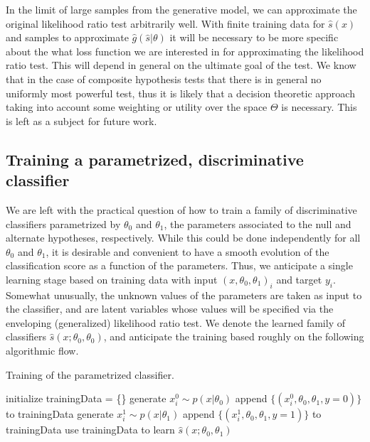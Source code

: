 \documentclass[11pt, oneside]{article}   	%
\begin{document}

In the  limit of large samples from the generative model,  we can approximate the original likelihood ratio test arbitrarily well. With finite training data for $\hat{s}(x)$ and samples to approximate $\hat{g}(\hat{s}|\theta)$ it will be necessary to be more specific about the what loss function we are interested in for approximating the likelihood ratio test. This will depend in general on the ultimate goal of the test. We know that in the case of composite hypothesis tests that there is in general no uniformly most powerful test, thus it is likely that a decision theoretic approach taking into account some weighting or utility over the space $\Theta$ is necessary. This is left as a subject for future work.


\subsection{Training a parametrized, discriminative classifier}

We are left with the practical question of how to train a family of discriminative classifiers parametrized by $\theta_0$ and $\theta_1$, the 
parameters associated to the null and alternate hypotheses, respectively. While this could be done independently
for all $\theta_0$ and $\theta_1$, it is desirable and convenient to have a smooth evolution of the classification score as a function of the parameters. Thus, we anticipate a single learning stage based on training data with input $(x, \theta_0, \theta_1)_i$ and target $y_i$. Somewhat unusually, the unknown values of the parameters are taken
as input to the classifier, and are latent variables whose values will be specified via the enveloping (generalized) likelihood ratio test. We denote the learned family of classifiers $\hat{s}(x; \theta_0, \theta_0)$, and anticipate the training based roughly on the following algorithmic flow.
\begin{algorithm}[ht]
\caption{Training of the parametrized classifier.}\label{alg:training}
\begin{algorithmic}
\STATE initialize trainingData = \{\}
		\STATE generate $x_i^0 \sim p(x|\theta_0)$
		\STATE append $\{ (x_i^0, \theta_0, \theta_1, y=0) \}$ to trainingData
		\STATE generate $x_i^1 \sim p(x|\theta_1)$
		\STATE append $\{ (x_i^1, \theta_0, \theta_1, y=1) \}$ to trainingData
	\ENDFOR
\ENDFOR
\STATE use trainingData to learn $\hat{s}(x; \theta_0, \theta_1)$
\end{algorithmic}
\end{algorithm}%
\end{document}
